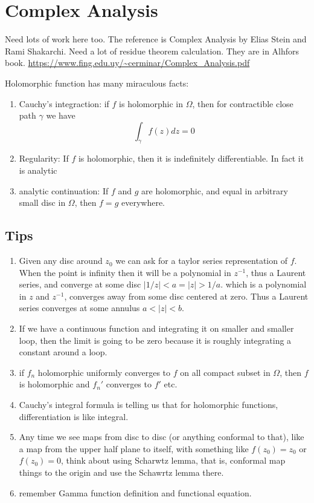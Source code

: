 \documentclass[main.tex]{subfiles}
\begin{document}
\section{Complex Analysis}
Need lots of work here too.
The reference is Complex Analysis by Elias Stein and Rami Shakarchi. Need a lot of residue theorem calculation. They are in Alhfors book. \url{https://www.fing.edu.uy/~cerminar/Complex_Analysis.pdf}

Holomorphic function has many miraculous facts:
\begin{enumerate}
    \item Cauchy's integraction: if $f$ is holomorphic in $\Omega$, then for contractible close path $\gamma$ we have 
    $$
    \int_\gamma f(z) dz = 0
    $$
    \item Regularity: If $f$ is holomorphic, then it is indefinitely differentiable. In fact it is analytic
    \item analytic continuation: If $f$ and $g$ are holomorphic, and equal in arbitrary small disc in $\Omega$, then $f = g$ everywhere.
\end{enumerate}

\subsection{Tips}
\begin{enumerate}
    \item Given any disc around $z_0$ we can ask for a taylor series representation of $f$. When the point is infinity then it will be a polynomial in $z^{-1}$, thus a Laurent series, and converge at some disc $|1/z| < a = |z| > 1/a$.
    which is a polynomial in $z$ and $z^{-1}$, converges away from some disc centered at zero. Thus a Laurent series converges at some annulus $a < |z| < b$.
    \item If we have a continuous function and integrating it on smaller and smaller loop, then the limit is going to be zero because it is roughly integrating a constant around a loop.
    \item if $f_n$ holomorphic uniformly converges to $f$ on all compact subset in $\Omega$, then $f$ is holomorphic and $f_n '$ converges to $f'$ etc.
    \item Cauchy's integral formula is telling us that for holomorphic functions, differentiation is like integral.
    \item Any time we see maps from disc to disc (or anything conformal to that), like a map from the upper half plane to itself, with something like $f(z_0) = z_0$ or $f(z_0) = 0$, think about using Scharwtz lemma, that is, conformal map things to the origin and use the Schawrtz lemma there.
    \item remember Gamma function definition and functional equation.
\end{enumerate}
\end{document}
